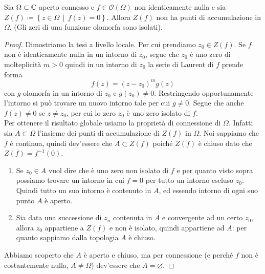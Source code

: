 \begin{theorem}
   \label{thr:zeri_di_funz_no_accum}
  Sia $\Omega \subset \mathbb{C}$ aperto connesso e $f\in \mathcal{O}(\Omega)$ non
  identicamente nulla e sia $Z(f) \coloneqq \left\{ z \in \Omega \,\middle|\,
  f(z) = 0 \right\}$. Allora  $Z(f)$ non ha punti di accumulazione in $\Omega$.
  (Gli zeri di una funzione olomorfa sono isolati).
\end{theorem}
\begin{proof}
    Dimostriamo la tesi a livello locale. Per cui prendiamo $z_0 \in Z(f)$. Se
    $f$ non è identicamente nulla in un intorno di $z_0$, segue che $z_0$ è uno
    zero di molteplicità $m > 0$ quindi in un intorno di $z_0$ la serie di
    Laurent di $f$ prende forma
    \begin{equation*}
      f(z) = (z-z_0)^m g(z)
    \end{equation*}
    con $g$ olomorfa in un intorno di $z_0$ e $g(z_0) \neq 0$.
    Restringendo opportunamente l'intorno si può trovare un nuovo intorno tale
    per cui $g \neq 0$. Segue che anche $f(z) \neq 0$ se $z \neq z_0$, per cui
    lo zero $z_0$ è uno zero isolato di $f$.\\

    Per ottenere il risultato globale usiamo la proprietà di connessione di
    $\Omega$. Infatti sia $A \subset \Omega$ l'insieme dei punti di
    accumulazione di $Z(f)$ in $\Omega$. Noi sappiamo che $f$ è continua, quindi
    dev'essere che $A \subset Z(f)$ poiché $Z(f)$ è chiuso dato che $Z(f) = f^{-1}(0)$.
    \begin{enumerate}
    	\item Se $z_0 \in A$ vuol dire che è uno zero non isolato
    	di $f$ e per quanto visto sopra possiamo trovare un intorno in cui $f =
    	0$ per tutto un intorno escluso $z_0$. Quindi tutto un suo intorno è contenuto in $A$, ed essendo intorno di ogni suo punto $A$ è aperto.
    	\item Sia data una successione di $z_n$ contenuta in $A$ e convergente ad un certo $z_0$, allora $z_0$ appartiene a $Z(f)$ e non è isolato, quindi appartiene ad $A$: per quanto sappiamo dalla topologia $A$ è chiuso.
    \end{enumerate}
  Abbiamo scoperto che $A$ è aperto e chiuso, ma per connessione (e perché $f$ non è costantemente nulla, $A \neq \Omega$) dev'essere che $A = \varnothing$.
\end{proof}


